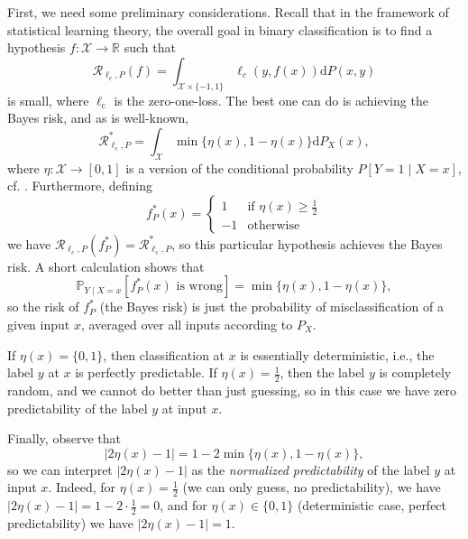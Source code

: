 \documentclass[letterpaper]{article} %
\newcommand{\R}{\mathbb{R}}
\newcommand{\Pb}{\mathbb{P}}
\newcommand{\inputSet}{\mathcal{X}} %
\newcommand{\risk}{\mathcal{R}} %
\newcommand{\Risk}[2]{\risk_{{#1},{#2}}} %
\newcommand{\RiskBayes}[2]{\risk_{{#1},{#2}}^\ast} %
\newcommand{\ellClass}{\ell_{\mathrm{c}}} %
\begin{document}
First, we need some preliminary considerations. Recall that in the framework of statistical learning theory, the overall goal in binary classification is to find a hypothesis $f: \inputSet \rightarrow \R$ such that
\begin{equation*}
    \Risk{\ell_c}{P}(f) = \int_{\inputSet\times\{-1,1\}} \ell_c(y,f(x)) \mathrm{d}P(x,y)
\end{equation*}
is small, where $\ellClass$ is the zero-one-loss.
The best one can do is achieving the Bayes risk, and as is well-known,
\begin{equation*}
    \RiskBayes{\ellClass}{P} = \int_\inputSet \min\{\eta(x), 1-\eta(x)\} \mathrm{d}P_X(x),
\end{equation*}
where $\eta: \inputSet\rightarrow[0,1]$ is a version of the conditional probability $P[Y=1 \mid X=x]$,
cf. \cite[Chapters~2,~8]{SC08}.
Furthermore, defining  
\begin{equation*}
    f_P^\ast(x) = \begin{cases}
        1 & \text{if } \eta(x)\geq \frac12 \\
        -1 & \text{otherwise}
    \end{cases}
\end{equation*}
we have $\Risk{\ell_c}{P}(f_P^\ast)=\RiskBayes{\ellClass}{P}$,
so this particular hypothesis achieves the Bayes risk.
A short calculation shows that
\begin{equation*}
        \Pb_{Y \mid X=x}[f_P^\ast(x) \text{ is wrong}] = \min\{\eta(x),1-\eta(x)\},
\end{equation*}
so the risk of $f_P^\ast$ (the Bayes risk) is just the probability of misclassification of a given input $x$, averaged over all inputs according to $P_X$.

If $\eta(x)=\{0,1\}$, then classification at $x$ is essentially deterministic, i.e., the label $y$ at $x$ is perfectly predictable.
If $\eta(x)=\frac12$, then the label $y$ is completely random, and we cannot do better than just guessing, so in this case we have zero predictability of the label $y$ at input $x$.

Finally, observe that
\begin{equation*}
    |2\eta(x)-1| = 1 - 2\min\{\eta(x), 1-\eta(x)\},
\end{equation*}
so we can interpret $|2\eta(x)-1|$ as the \emph{normalized predictability} of the label $y$ at input $x$. 
Indeed, for $\eta(x)=\frac12$ (we can only guess, no predictability), we have $|2\eta(x)-1|=1-2\cdot\frac12=0$, and for $\eta(x)\in\{0,1\}$ (deterministic case, perfect predictability) we have $|2\eta(x)-1|=1$.
\end{document}
